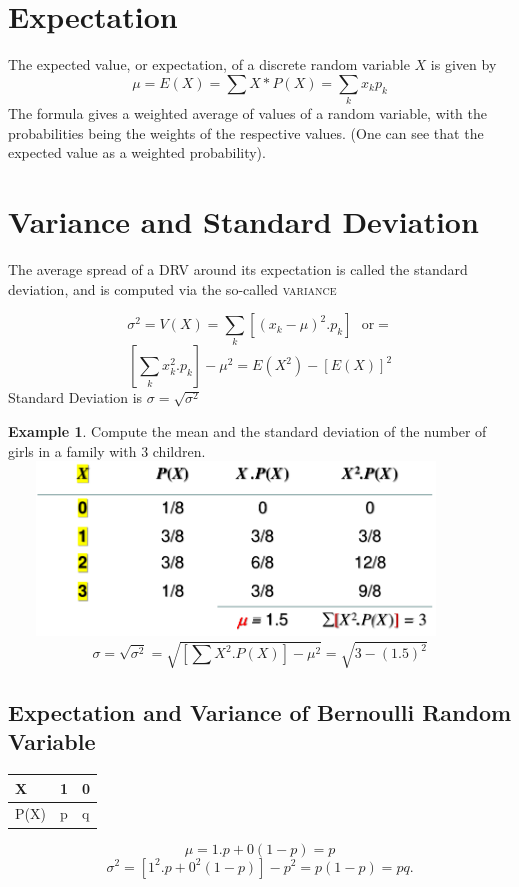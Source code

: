 \documentclass[12pt]{article}
\theoremstyle{definition}
\newtheorem{exmp}{Example}[section]
\begin{document}
\section{Expectation}
The expected value, or expectation, of a discrete random variable $X$ is given by
\[
    \displaystyle \mu = E(X) = \sum X *P(X) = \sum_k x_k p_k
\]
The formula gives a weighted average of values
of a random variable, with the probabilities being
the weights of the respective values.
(One can see that the expected value as a weighted probability).
\section{Variance and Standard Deviation}
The average spread of a DRV around its expectation is called the standard
deviation, and is computed via the so-called \textsc{variance}

\[
    \displaystyle \sigma^2 = V(X) = \sum_k  [(x_k -\mu)^2.p_k]\ \ \  \text{or} = 
\]  
\[
    \displaystyle [\sum_k x^2_k.p_k] - \mu^2 = E(X^2) - [E(X)]^2
\]
Standard Deviation is $\sigma = \sqrt{\sigma^2}$
\begin{exmp}
    Compute the mean and the standard deviation of the number of girls in a family with 3 children.\\

    \ \ \ \   \includegraphics[width=400px]{4.png}
    \[
        \sigma = \sqrt{\sigma^2} = \sqrt{[\sum X^2.P(X)]- \mu^2} = \sqrt{3-(1.5)^2}
    \]
\end{exmp}
\subsection{Expectation and Variance of Bernoulli Random Variable}
\begin{longtable}[c]{l|l|l}
    X    &  1   & 0   \\ \hline 
    \endfirsthead
    \endhead
    P(X) & p&  q
\end{longtable}
\[
    \mu = 1.p + 0(1-p) = p
\]
\[
    \sigma^2 = [1^2.p + 0^2(1-p)] - p^2 = p(1-p) = pq.
\]
\end{document}
